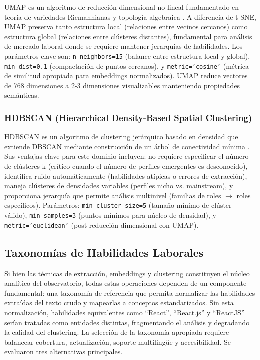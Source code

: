 UMAP es un algoritmo de reducción dimensional no lineal fundamentado en teoría de variedades Riemannianas y topología algebraica \cite{mcinnes2018umap}. A diferencia de t-SNE, UMAP preserva tanto estructura local (relaciones entre vecinos cercanos) como estructura global (relaciones entre clústeres distantes), fundamental para análisis de mercado laboral donde se requiere mantener jerarquías de habilidades. Los parámetros clave son: \texttt{n\_neighbors=15} (balance entre estructura local y global), \texttt{min\_dist=0.1} (compactación de puntos cercanos), y \texttt{metric='cosine'} (métrica de similitud apropiada para embeddings normalizados). UMAP reduce vectores de 768 dimensiones a 2-3 dimensiones visualizables manteniendo propiedades semánticas.

\subsubsection{HDBSCAN (Hierarchical Density-Based Spatial Clustering)}

HDBSCAN es un algoritmo de clustering jerárquico basado en densidad que extiende DBSCAN mediante construcción de un árbol de conectividad mínima \cite{campello2013}. Sus ventajas clave para este dominio incluyen: no requiere especificar el número de clústeres k (crítico cuando el número de perfiles emergentes es desconocido), identifica ruido automáticamente (habilidades atípicas o errores de extracción), maneja clústeres de densidades variables (perfiles nicho vs. mainstream), y proporciona jerarquía que permite análisis multinivel (familias de roles $\rightarrow$ roles específicos). Parámetros: \texttt{min\_cluster\_size=5} (tamaño mínimo de clúster válido), \texttt{min\_samples=3} (puntos mínimos para núcleo de densidad), y \texttt{metric='euclidean'} (post-reducción dimensional con UMAP).

\subsection{Taxonomías de Habilidades Laborales}

Si bien las técnicas de extracción, embeddings y clustering constituyen el núcleo analítico del observatorio, todas estas operaciones dependen de un componente fundamental: una taxonomía de referencia que permita normalizar las habilidades extraídas del texto crudo y mapearlas a conceptos estandarizados. Sin esta normalización, habilidades equivalentes como ``React'', ``React.js'' y ``ReactJS'' serían tratadas como entidades distintas, fragmentando el análisis y degradando la calidad del clustering. La selección de la taxonomía apropiada requiere balancear cobertura, actualización, soporte multilingüe y accesibilidad. Se evaluaron tres alternativas principales.


